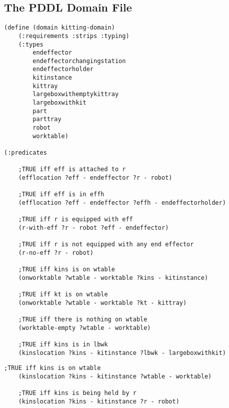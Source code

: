 \begin{appendices}

\section{The PDDL Domain File}\label{appendix:A}
\begin{minipage}{.5\paperwidth}
\begin{mylisting}
\begin{Verbatim}[commandchars=\\\{\},commandchars=+\[\],fontsize=\small,numbersep=3pt]
(define (domain kitting-domain)
	(:requirements :strips :typing)
	(:types
		endeffector
		endeffectorchangingstation
		endeffectorholder
		kitinstance
		kittray
		largeboxwithemptykittray
		largeboxwithkit
		part
		parttray
		robot
		worktable)

(:predicates
	
	;TRUE iff eff is attached to r
	(efflocation ?eff - endeffector ?r - robot)	
		
	;TRUE iff eff is in effh		
	(efflocation ?eff - endeffector ?effh - endeffectorholder)

	;TRUE iff r is equipped with eff
	(r-with-eff ?r - robot ?eff - endeffector)				
		
	;TRUE iff r is not equipped with any end effector
	(r-no-eff ?r - robot)						
		
	;TRUE iff kins is on wtable		
	(onworktable ?wtable - worktable ?kins - kitinstance)
		
	;TRUE iff kt is on wtable
	(onworktable ?wtable - worktable ?kt - kittray)	
	
	;TRUE iff there is nothing on wtable
	(worktable-empty ?wtable - worktable)
	
	;TRUE iff kins is in lbwk
	(kinslocation ?kins - kitinstance ?lbwk - largeboxwithkit)		

\end{Verbatim}
\end{mylisting}
\end{minipage}

\begin{minipage}{.5\paperwidth}
\begin{mylisting}
\begin{Verbatim}[commandchars=\\\{\},commandchars=+\[\],fontsize=\small,numbersep=3pt]
	;TRUE iff kins is on wtable
	(kinslocation ?kins - kitinstance ?wtable - worktable)	

	;TRUE iff kins is being held by r
	(kinslocation ?kins - kitinstance ?r - robot)				
	

\end{Verbatim}
\end{mylisting}
\end{minipage}
\end{appendices}
